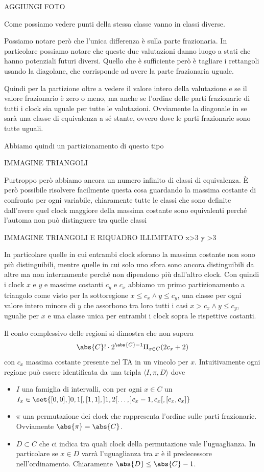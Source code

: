 AGGIUNGI FOTO

Come possiamo vedere punti della stessa classe vanno in classi diverse.

Possiamo notare però che l'unica differenza è sulla parte frazionaria. In particolare possiamo notare che queste due valutazioni danno luogo a stati che hanno potenziali futuri diversi. Quello che è sufficiente però è tagliare i rettangoli usando la diagolane, che corrisponde ad avere la parte frazionaria uguale.

Quindi per la partizione oltre a vedere il valore intero della valutazione e se il valore frazionario è zero o meno, ma anche se l'ordine delle parti frazionarie di tutti i clock sia uguale per tutte le valutazioni. Ovviamente la diagonale in se sarà una classe di equivalenza a sé stante, ovvero dove le parti frazionarie sono tutte uguali.

Abbiamo quindi un partizionamento di questo tipo

IMMAGINE TRIANGOLI

Purtroppo però abbiamo ancora un numero infinito di classi di equivalenza. È però possibile risolvere facilmente questa cosa guardando la massima costante di confronto per ogni variabile, chiaramente tutte le classi che sono definite dall'avere quel clock maggiore della massima costante sono equivalenti perché l'automa non può distinguere tra quelle classi

IMMAGINE TRIANGOLI E RIQUADRO ILLIMITATO x>3 y >3

In particolare quelle in cui entrambi clock sforano la massima costante non sono più distinguibili, mentre quelle in cui solo uno sfora sono ancora distinguibili da altre ma non internamente perché non dipendono più dall'altro clock. Con quindi i clock \(x\) e \(y\) e massime costanti \(c_y\) e \(c_x\) abbiamo un primo partizionamento a triangolo come visto per la sottoregione \(x\leq c_x \land y \leq c_y\), una classe per ogni valore intero minore di \(y\) che assorbono tra loro tutti i casi \(x> c_x \land y \leq c_y\), ugualie per \(x\) e una classe unica per entrambi i clock sopra le rispettive costanti.

Il conto complessivo delle regioni si dimostra che non supera
\[\abs{C}! \cdot 2^{\abs{C}-1}\Pi_{x \in C} (2c_x+2)\]
 con \(c_x\) massima costante presente nel TA in un vincolo per \(x\). Intuitivamente ogni regione può essere identificata da una tripla \(\langle I, \pi, D\rangle\) dove
\begin{itemize}
  \item \(I\) una famiglia di intervalli, con per ogni \(x \in C\) un  \(I_x \in \set{[0,0], ]0,1[, [1,1], ]1,2[\ldots,]c_x-1,c_x[,[c_x,c_x]}\)
  \item \(\pi\) una permutazione dei clock che rappresenta l'ordine sulle parti frazionarie. Ovviamente \(\abs{\pi} = \abs{C}\).
  \item \(D\subset C\) che ci indica tra quali clock della permutazione vale l'uguaglianza. In particolare se \(x\in D\) varrà l'uguaglianza tra \(x\) è il predecessore nell'ordinamento. Chiaramente \(\abs{D}\leq\abs{C}-1\).
\end{itemize}

